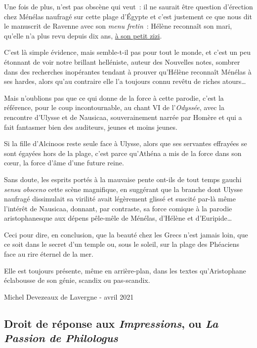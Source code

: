 \documentclass{book}%
\newcommand{\italique}[1]{\textit{#1}}%
\begin{document}
Une fois de plus, n’est pas obscène qui veut : il ne saurait être question d’érection chez Ménélas naufragé sur cette plage d’Égypte et c’est justement ce que nous dit le manuscrit de Ravenne avec son \italique{menu fretin} : Hélène reconnaît son mari, qu’elle n’a plus revu depuis dix ans, \underline{à son petit zizi}. 

C’est là simple évidence, mais semble-t-il pas pour tout le monde, et c’est un peu étonnant de voir notre brillant helléniste, auteur des Nouvelles notes, sombrer dans des recherches inopérantes tendant à prouver qu’Hélène reconnaît Ménélas à ses hardes, alors qu’au contraire elle l’a toujours connu revêtu de riches atours… 

Mais n’oublions pas que ce qui donne de la force à cette parodie, c’est la référence, pour le coup incontournable, au chant VI de l’\italique{Odyssée}, avec la rencontre d’Ulysse et de Nausicaa, souverainement narrée par Homère et qui a fait fantasmer bien des auditeurs, jeunes et moins jeunes. 

Si la fille d’Alcinoos reste seule face à Ulysse, alors que ses servantes effrayées se sont égayées hors de la plage, c’est parce qu’Athéna a mis de la force dans son cœur, la force d’âme d’une future reine. 

Sans doute, les esprits portés à la mauvaise pente ont-ils de tout temps gauchi \italique{sensu obsceno} cette scène magnifique, en suggérant que la branche dont Ulysse naufragé dissimulait sa virilité avait légèrement glissé et suscité par-là même l’intérêt de Nausicaa, donnant, par contraste, sa force comique à la parodie aristophanesque aux dépens pêle-mêle de Ménélas, d’Hélène et d’Euripide… 

Ceci pour dire, en conclusion, que la beauté chez les Grecs n’est jamais loin, que ce soit dans le secret d’un temple ou, sous le soleil, sur la plage des Phéaciens face au rire éternel de la mer. 

Elle est toujours présente, même en arrière-plan, dans les textes qu’Aristophane éclabousse de son génie, scandix ou pas-scandix. 

\begin{flushright}Michel Devezeaux de Lavergne - avril 2021\end{flushright}

\subsection*{Droit de réponse aux \italique{Impressions}, ou \italique{La Passion de Philologus}}
\end{document}
